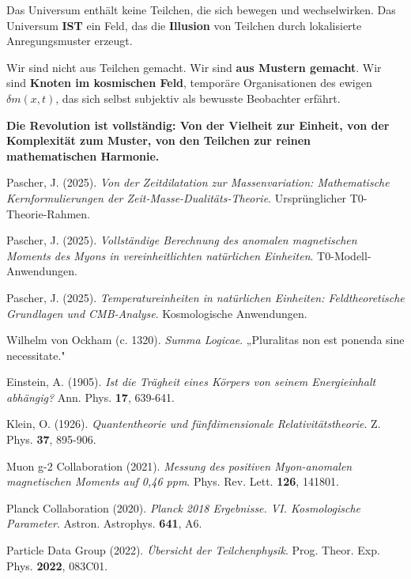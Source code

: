\documentclass[12pt,a4paper]{article}
\newcommand{\deltam}{\delta m}
\theoremstyle{definition}
\theoremstyle{remark}
\begin{document}
	Das Universum enthält keine Teilchen, die sich bewegen und wechselwirken. Das Universum \textbf{IST} ein Feld, das die \textbf{Illusion} von Teilchen durch lokalisierte Anregungsmuster erzeugt.
	
	Wir sind nicht aus Teilchen gemacht. Wir sind \textbf{aus Mustern gemacht}. Wir sind \textbf{Knoten im kosmischen Feld}, temporäre Organisationen des ewigen $\deltam(x,t)$, das sich selbst subjektiv als bewusste Beobachter erfährt.
	
	\textbf{Die Revolution ist vollständig: Von der Vielheit zur Einheit, von der Komplexität zum Muster, von den Teilchen zur reinen mathematischen Harmonie.}
	
	\begin{thebibliography}{99}
		Pascher, J. (2025). \textit{Von der Zeitdilatation zur Massenvariation: Mathematische Kernformulierungen der Zeit-Masse-Dualitäts-Theorie}. Ursprünglicher T0-Theorie-Rahmen.
		
		Pascher, J. (2025). \textit{Vollständige Berechnung des anomalen magnetischen Moments des Myons in vereinheitlichten natürlichen Einheiten}. T0-Modell-Anwendungen.
		
		Pascher, J. (2025). \textit{Temperatureinheiten in natürlichen Einheiten: Feldtheoretische Grundlagen und CMB-Analyse}. Kosmologische Anwendungen.
		
		Wilhelm von Ockham (c. 1320). \textit{Summa Logicae}. „Pluralitas non est ponenda sine necessitate."
		
		Einstein, A. (1905). \textit{Ist die Trägheit eines Körpers von seinem Energieinhalt abhängig?} Ann. Phys. \textbf{17}, 639-641.
		
		Klein, O. (1926). \textit{Quantentheorie und fünfdimensionale Relativitätstheorie}. Z. Phys. \textbf{37}, 895-906.
		
		Muon g-2 Collaboration (2021). \textit{Messung des positiven Myon-anomalen magnetischen Moments auf 0{,}46 ppm}. Phys. Rev. Lett. \textbf{126}, 141801.
		
		Planck Collaboration (2020). \textit{Planck 2018 Ergebnisse. VI. Kosmologische Parameter}. Astron. Astrophys. \textbf{641}, A6.
		
		Particle Data Group (2022). \textit{Übersicht der Teilchenphysik}. Prog. Theor. Exp. Phys. \textbf{2022}, 083C01.
	\end{thebibliography}
	
	
\end{document}
